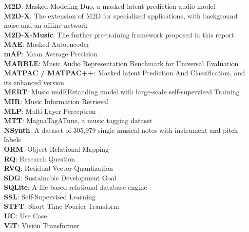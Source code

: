 \documentclass{FastFyp}
\begin{document}
\textbf{M2D}: Masked Modeling Duo, a masked-latent-prediction audio model\\
\textbf{M2D-X}: The extension of M2D for specialized applications, with background noise and an offline network\\
\textbf{M2D-X-Music}: The further pre-training framework proposed in this report\\
\textbf{MAE}: Masked Autoencoder\\
\textbf{mAP}: Mean Average Precision\\
\textbf{MARBLE}: Music Audio Representation Benchmark for Universal Evaluation\\
\textbf{MATPAC / MATPAC++}: Masked latent Prediction And Classification, and its enhanced version\\
\textbf{MERT}: Music undERstanding model with large-scale self-supervised Training\\
\textbf{MIR}: Music Information Retrieval\\
\textbf{MLP}: Multi-Layer Perceptron\\
\textbf{MTT}: MagnaTagATune, a music tagging dataset\\
\textbf{NSynth}: A dataset of 305,979 single musical notes with instrument and pitch labels\\
\textbf{ORM}: Object-Relational Mapping\\
\textbf{RQ}: Research Question\\
\textbf{RVQ}: Residual Vector Quantization\\
\textbf{SDG}: Sustainable Development Goal\\
\textbf{SQLite}: A file-based relational database engine\\
\textbf{SSL}: Self-Supervised Learning\\
\textbf{STFT}: Short-Time Fourier Transform\\
\textbf{UC}: Use Case\\
\textbf{ViT}: Vision Transformer

\FloatBarrier
\end{document}
